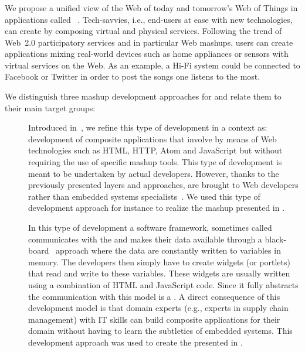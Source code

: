 \subsubsection{\pMashups{}}
We propose a unified view of the Web of today and tomorrow's Web of Things in applications called \important{\pMashups{}}~\cite{Wilde2007,Guinard2009-INSS,Guinard2010-WoT}. Tech-savvies, i.e., end-users at ease with new technologies, can create \pMashups{} by composing virtual and physical services. Following the trend of Web~2.0 participatory services and in particular Web mashups, users can create applications mixing real-world devices such as home appliances or sensors with virtual services on the Web. As an example, a Hi-Fi system could be connected to Facebook or Twitter in order to post the songs one listens to the most.

We distinguish three mashup development approaches for \pMashups{} and relate them to their main target groups:\begin{description}
 \item[\mashupLevelA{}] Introduced in~\cite{Yu2008a}, we refine this type of development in a \WoT{} context as: development of composite applications that involve \sts{} by means of Web technologies such as HTML, HTTP, Atom and JavaScript but without requiring the use of specific mashup tools. This type of development is meant to be undertaken by actual developers. However, thanks to the previously presented layers and approaches, \sts{} are brought to Web developers rather than embedded systems specialists~\cite{Mottola2011}. We used this type of development approach for instance to realize the  mashup presented in .

 
 \item[\mashupLevelB{}] In this type of development a software framework, sometimes called  communicates with the \sts{} and makes their data available through a black-board~\cite{Yu2008a} approach where the data are constantly written to variables in memory. The developers then simply have to create widgets (or portlets) that read and write to these variables. These widgets are usually written using a combination of HTML and JavaScript code. Since it fully abstracts the communication with \sts{} this model is a . A direct consequence of this development model is that domain experts (e.g., experts in supply chain management) with IT skills can build composite applications for their domain without having to learn the subtleties of embedded systems. This development approach was used to create the  presented in .


\end{description}
